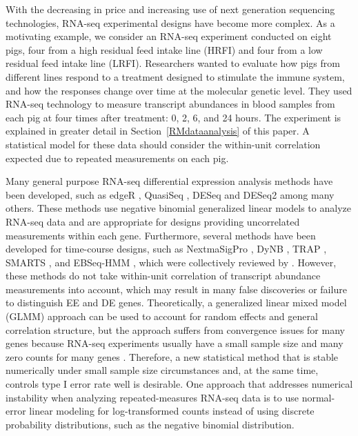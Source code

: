 With the decreasing in price  and increasing use of next generation sequencing technologies, RNA-seq experimental designs have become more complex. As a motivating example, we consider an RNA-seq experiment conducted on eight pigs, four from a high residual feed intake line (HRFI) and  four from a low residual feed intake line (LRFI). Researchers wanted to evaluate how pigs from different lines respond to a treatment designed to stimulate the immune system, and how the responses change over time at the molecular genetic level. They used RNA-seq technology to measure transcript abundances in blood samples from each pig at four times after treatment: 0, 2, 6, and 24 hours. The experiment is explained in greater detail in Section~\ref{RMdataanalysis} of this paper. A  statistical model for these data should consider the within-unit correlation  expected due to repeated measurements on each pig. 

Many general purpose  RNA-seq differential expression analysis methods have been developed,  such as edgeR \citep{Robinson2010a}, QuasiSeq \citep{lund2012},  DESeq and DESeq2 \citep{anders2010, love2014} among many others. These methods use negative binomial generalized linear models to analyze  RNA-seq data and are appropriate for designs providing uncorrelated measurements within each gene. Furthermore, several  methods have been developed for time-course designs, such as NextmaSigPro \citep{nueda2014}, DyNB \citep{aijo2014}, TRAP \citep{jo2014}, SMARTS \citep{wise2015}, and EBSeq-HMM \citep{leng2015}, which were collectively reviewed  by  \citet{spies2015}.  However, these methods do not take within-unit correlation of transcript abundance measurements into account, which may result in many false discoveries or failure to distinguish EE and DE genes. Theoretically, a generalized linear mixed model (GLMM) approach can be used to account for random effects and general correlation structure, but the approach  suffers from convergence issues for many genes because RNA-seq experiments usually have  a small sample size and many zero counts for many genes \citep{cui2016}. Therefore, a new statistical method that is stable numerically under small sample size circumstances and,  at the same time,  controls type I error rate well is desirable. One approach that addresses numerical instability  when analyzing repeated-measures RNA-seq data is to use normal-error linear modeling for log-transformed counts instead of using  discrete probability distributions, such as the negative binomial distribution. 

